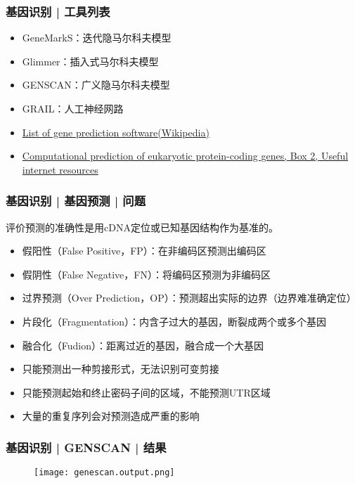 \begin{frame}
  \frametitle{基因识别 | 工具列表}
  \begin{itemize}
    \item GeneMarkS：迭代隐马尔科夫模型
    \item Glimmer：插入式马尔科夫模型
    \item GENSCAN：广义隐马尔科夫模型
    \item GRAIL：人工神经网路
    \item \href{http://en.wikipedia.org/wiki/List\_of\_gene\_prediction\_software}{List of gene prediction software(Wikipedia)}
    \item \href{http://www.nature.com/nrg/journal/v3/n9/box/nrg890\_BX2.html}{Computational prediction of eukaryotic protein-coding genes, Box 2, Useful internet resources}
  \end{itemize}
\end{frame}

\begin{frame}
  \frametitle{基因识别 | 基因预测 | 问题}
  评价预测的准确性是用cDNA定位或已知基因结构作为基准的。
  \begin{itemize}
    \item 假阳性（False Positive，FP）：在非编码区预测出编码区
    \item 假阴性（False Negative，FN）：将编码区预测为非编码区
    \item 过界预测（Over Prediction，OP）：预测超出实际的边界（边界难准确定位）
    \item 片段化（Fragmentation）：内含子过大的基因，断裂成两个或多个基因
    \item 融合化（Fudion）：距离过近的基因，融合成一个大基因
    \item 只能预测出一种剪接形式，无法识别可变剪接
    \item 只能预测起始和终止密码子间的区域，不能预测UTR区域
    \item 大量的重复序列会对预测造成严重的影响
  \end{itemize}
\end{frame}

\begin{frame}
  \frametitle{基因识别 | GENSCAN | 结果}
  \begin{figure}
    \centering
    \texttt{[image: genescan.output.png]}
  \end{figure}
\end{frame}

